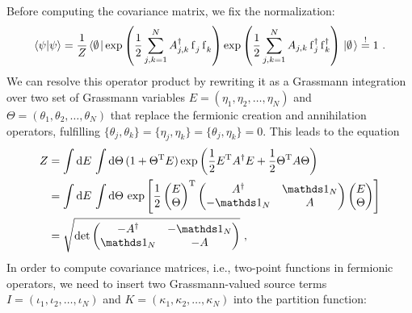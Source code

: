 \documentclass[letter]{article}
\newcommand{\intd}[1]{\int\mathrm{d}#1\,}
\begin{document}
Before computing the covariance matrix, we fix the normalization:
\begin{equation}
\braket{\psi}\psi = \frac{1}{Z} \vacbra \exp\left( \frac{1}{2} \sum_{j,k=1}^N A^\dagger_{j,k} \fe_j \fe_k \right) \exp\left( \frac{1}{2} \sum_{j,k=1}^N A_{j,k} \fd_j \fd_k \right) \vacket \overset{!}{=} 1 \ .
\end{equation}
We can resolve this operator product by rewriting it as a Grassmann integration over two set of Grassmann variables $E=(\eta_1,\eta_2,\dots,\eta_N)$ and $\Theta=(\theta_1,\theta_2,\dots,\theta_N)$ that replace the fermionic creation and annihilation operators, fulfilling $\{ \theta_j,\theta_k \} = \{ \eta_j,\eta_k \} =\{ \theta_j,\eta_k \} = 0$. This leads to the equation
\begin{align}
Z &= \intd{E}\intd{\Theta} ( 1 + \Theta^\mathrm{T} E) \exp\left( \frac{1}{2} E^\mathrm{T} A^\dagger E + \frac{1}{2} \Theta^\mathrm{T} A \Theta \right) \nonumber\\
&= \intd{E}\intd{\Theta}
\exp\left[
\frac{1}{2}
\begin{pmatrix}
E \\
\Theta
\end{pmatrix}^\mathrm{T}
\begin{pmatrix}
A^\dagger & \id_N \\
-\id_N    & A
\end{pmatrix}
\begin{pmatrix}
E \\
\Theta
\end{pmatrix}
\right] \nonumber\\
&= \sqrt{\det{
\begin{pmatrix}
-A^\dagger & -\id_N \\
\id_N    & -A
\end{pmatrix}}} \ ,
\end{align}
In order to compute covariance matrices, i.e., two-point functions in fermionic operators, we need to insert two Grassmann-valued source terms $I=(\iota_1,\iota_2,\dots,\iota_{N})$ and $K=(\kappa_1,\kappa_2,\dots,\kappa_{N})$  into the partition function:
\end{document}
